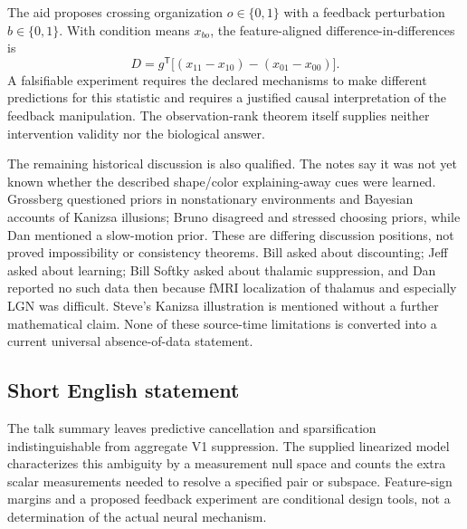 \documentclass[11pt]{article}
\begin{document}
The aid proposes crossing organization \(o\in\{0,1\}\) with a feedback perturbation \(b\in\{0,1\}\). With condition means \(x_{bo}\), the feature-aligned difference-in-differences is
\[
 D=g^{\mathsf T}\bigl[(x_{11}-x_{10})-(x_{01}-x_{00})\bigr].
\]
A falsifiable experiment requires the declared mechanisms to make different predictions for this statistic and requires a justified causal interpretation of the feedback manipulation. The observation-rank theorem itself supplies neither intervention validity nor the biological answer.

The remaining historical discussion is also qualified. The notes say it was not yet known whether the described shape/color explaining-away cues were learned. Grossberg questioned priors in nonstationary environments and Bayesian accounts of Kanizsa illusions; Bruno disagreed and stressed choosing priors, while Dan mentioned a slow-motion prior. These are differing discussion positions, not proved impossibility or consistency theorems. Bill asked about discounting; Jeff asked about learning; Bill Softky asked about thalamic suppression, and Dan reported no such data then because fMRI localization of thalamus and especially LGN was difficult. Steve's Kanizsa illustration is mentioned without a further mathematical claim. None of these source-time limitations is converted into a current universal absence-of-data statement.
\subsection{Short English statement}
The talk summary leaves predictive cancellation and sparsification indistinguishable from aggregate V1 suppression. The supplied linearized model characterizes this ambiguity by a measurement null space and counts the extra scalar measurements needed to resolve a specified pair or subspace. Feature-sign margins and a proposed feedback experiment are conditional design tools, not a determination of the actual neural mechanism.
\end{document}
